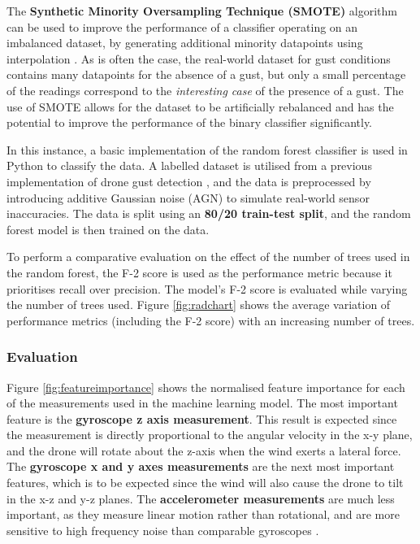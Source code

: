 The  \textbf{Synthetic Minority Oversampling Technique (SMOTE)} algorithm can be used to improve the performance of a classifier operating on an imbalanced dataset, by generating additional minority datapoints using interpolation \cite{chawla2002smote}. As is often the case, the real-world dataset for gust conditions contains many datapoints for the absence of a gust, but only a small percentage of the readings correspond to the \textit{interesting case} of the presence of a gust. The use of SMOTE allows for the dataset to be artificially rebalanced and has the potential to improve the performance of the binary classifier significantly.

In this instance, a basic implementation of the random forest classifier \cite{scikit-learn} is used in Python to classify the data. A labelled dataset is utilised from a previous implementation of drone gust detection \cite{gu2018wind}, and the data is preprocessed by introducing additive Gaussian noise (AGN) to simulate real-world sensor inaccuracies. The data is split using an \textbf{80/20 train-test split}, and the random forest model is then trained on the data. 

To perform a comparative evaluation on the effect of the number of trees used in the random forest, the F-2 score is used as the performance metric because it prioritises recall over precision. The model's F-2 score is evaluated while varying the number of trees used. Figure \ref{fig:radchart} shows the average variation of performance metrics (including the F-2 score) with an increasing number of trees. 

\subsubsection{Evaluation}

Figure \ref{fig:featureimportance} shows the normalised feature importance for each of the measurements used in the machine learning model. The most important feature is the \textbf{gyroscope z axis measurement}. This result is expected since the measurement is directly proportional to the angular velocity in the x-y plane, and the drone will rotate about the z-axis when the wind exerts a lateral force. The \textbf{gyroscope x and y axes measurements} are the next most important features, which is to be expected since the wind will also cause the drone to tilt in the x-z and y-z planes. The \textbf{accelerometer measurements} are much less important, as they measure linear motion rather than rotational, and are more sensitive to high frequency noise than comparable gyroscopes \cite{CASSON2016175}. 

